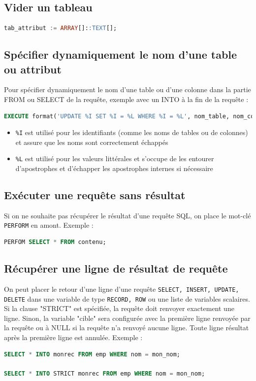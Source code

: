 \subsection{Vider un tableau}
\begin{lstlisting}[language=SQL]
tab_attribut := ARRAY[]::TEXT[];
\end{lstlisting}

\subsection{Spécifier dynamiquement le nom d'une table ou attribut}
Pour spécifier dynamiquement le nom d'une table ou d'une colonne dans la partie FROM ou SELECT de la requête, exemple avec un INTO à la fin de la requête :
\begin{lstlisting}[language=SQL]
EXECUTE format('UPDATE %I SET %I = %L WHERE %I = %L', nom_table, nom_colonne, valeur_colonne, condition_colonne, condition_valeur);
\end{lstlisting}
\begin{itemize}
    \item \texttt{\%I} est utilisé pour les identifiants (comme les noms de tables ou de colonnes) et assure que les noms sont correctement échappés
    \item \texttt{\%L} est utilisé pour les valeurs littérales et s'occupe de les entourer d'apostrophes et d'échapper les apostrophes internes si nécessaire
\end{itemize}

\subsection{Exécuter une requête sans résultat}
Si on ne souhaite pas récupérer le résultat d'une requête SQL, on place le mot-clé \texttt{PERFORM} en amont. Exemple :

\begin{lstlisting}[language=SQL]
PERFOM SELECT * FROM contenu;
\end{lstlisting}

\subsection{Récupérer une ligne de résultat de requête}
On peut placer le retour d'une ligne d'une requête \texttt{SELECT, INSERT, UPDATE, DELETE} dans une variable de type \texttt{RECORD, ROW} ou une liste de variables scalaires. Si la clause "STRICT" est spécifiée, la requête doit renvoyer exactement une ligne. Sinon, la variable "cible" sera configurée avec la première ligne renvoyée par la requête ou à NULL si la requête n'a renvoyé aucune ligne. Toute ligne résultat après la première ligne est annulée. Exemple :
\begin{lstlisting}[language=SQL]
SELECT * INTO monrec FROM emp WHERE nom = mon_nom;

SELECT * INTO STRICT monrec FROM emp WHERE nom = mon_nom;
\end{lstlisting}

